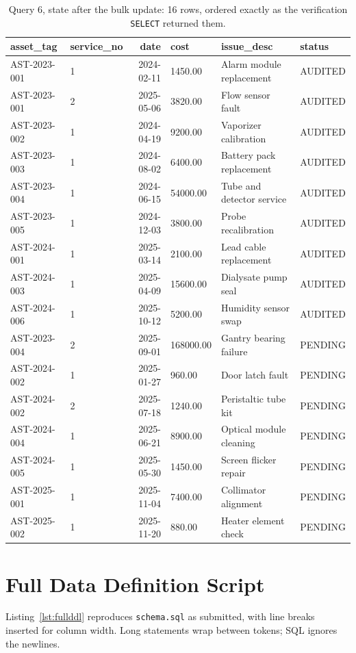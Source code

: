\documentclass[conference]{IEEEtran}
\begin{document}
\begin{table}[!t]
\caption{Query 6, state after the bulk update: 16 rows, ordered exactly as the verification \texttt{SELECT} returned them.}
\label{tab:q6full}
\centering
\footnotesize
\begin{tabular}{llrlp{2.8cm}l}
\toprule
asset\_tag & service\_no & date & cost & issue\_desc & status \\
\midrule
AST-2023-001 & 1 & 2024-02-11 & 1450.00 & Alarm module replacement & AUDITED \\
AST-2023-001 & 2 & 2025-05-06 & 3820.00 & Flow sensor fault & AUDITED \\
AST-2023-002 & 1 & 2024-04-19 & 9200.00 & Vaporizer calibration & AUDITED \\
AST-2023-003 & 1 & 2024-08-02 & 6400.00 & Battery pack replacement & AUDITED \\
AST-2023-004 & 1 & 2024-06-15 & 54000.00 & Tube and detector service & AUDITED \\
AST-2023-005 & 1 & 2024-12-03 & 3800.00 & Probe recalibration & AUDITED \\
AST-2024-001 & 1 & 2025-03-14 & 2100.00 & Lead cable replacement & AUDITED \\
AST-2024-003 & 1 & 2025-04-09 & 15600.00 & Dialysate pump seal & AUDITED \\
AST-2024-006 & 1 & 2025-10-12 & 5200.00 & Humidity sensor swap & AUDITED \\
AST-2023-004 & 2 & 2025-09-01 & 168000.00 & Gantry bearing failure & PENDING \\
AST-2024-002 & 1 & 2025-01-27 & 960.00 & Door latch fault & PENDING \\
AST-2024-002 & 2 & 2025-07-18 & 1240.00 & Peristaltic tube kit & PENDING \\
AST-2024-004 & 1 & 2025-06-21 & 8900.00 & Optical module cleaning & PENDING \\
AST-2024-005 & 1 & 2025-05-30 & 1450.00 & Screen flicker repair & PENDING \\
AST-2025-001 & 1 & 2025-11-04 & 7400.00 & Collimator alignment & PENDING \\
AST-2025-002 & 1 & 2025-11-20 & 880.00 & Heater element check & PENDING \\
\bottomrule
\end{tabular}
\end{table}

\section{Full Data Definition Script}\label{app:ddl}
Listing~\ref{lst:fullddl} reproduces \texttt{schema.sql} as submitted, with
line breaks inserted for column width. Long statements wrap between tokens;
SQL ignores the newlines.
\end{document}
